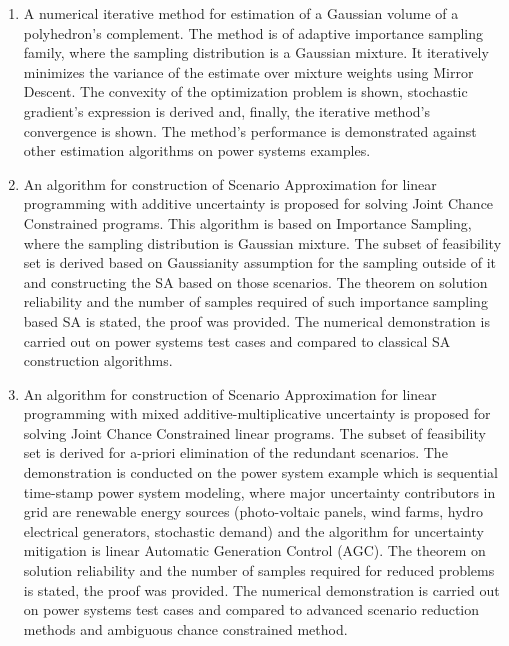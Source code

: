 \begin{enumerate}

    \item A numerical iterative method for estimation of a Gaussian volume of a polyhedron's complement. The method is of adaptive importance sampling family, where the sampling distribution is a Gaussian mixture. It iteratively minimizes the variance of the estimate over mixture weights using Mirror Descent. The convexity of the optimization problem is shown, stochastic gradient's expression is derived and, finally, the iterative method's convergence is shown. The method's performance is demonstrated against other estimation algorithms on power systems examples.
    \item An algorithm for construction of Scenario Approximation for linear programming with additive uncertainty is proposed for solving Joint Chance Constrained programs. This algorithm is based on Importance Sampling, where the sampling distribution is Gaussian mixture. The subset of feasibility set is derived based on Gaussianity assumption for the sampling outside of it and constructing the SA based on those scenarios. The theorem on solution reliability and the number of samples required of such importance sampling based SA is stated, the proof was provided. The numerical demonstration is carried out on power systems test cases and compared to classical SA construction algorithms.
    \item An algorithm for construction of Scenario Approximation for linear programming with mixed additive-multiplicative uncertainty is proposed for solving Joint Chance Constrained linear programs. The subset of feasibility set is derived for a-priori elimination of the redundant scenarios. The demonstration is conducted on the power system example which is sequential time-stamp power system modeling, where major uncertainty contributors in grid are renewable energy sources (photo-voltaic panels, wind farms, hydro electrical generators, stochastic demand) and the algorithm for uncertainty mitigation is linear Automatic Generation Control (AGC).
    The theorem on solution reliability and the number of samples required for reduced problems is stated, the proof was provided. The numerical demonstration is carried out on power systems test cases and compared to advanced scenario reduction methods and ambiguous chance constrained method.
 
\end{enumerate}

